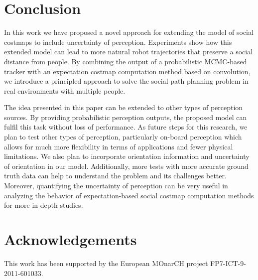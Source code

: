 \section{Conclusion}
\label{sec:conclusion}

In this work we have proposed a novel approach for extending the model of social costmaps to include uncertainty of perception. Experiments show how this extended model can lead to more natural robot trajectories that preserve a social distance from people. By combining the output of a probabilistic MCMC-based tracker with an expectation costmap computation method based on convolution, we introduce a principled approach to solve the social path planning problem in real environments with multiple people. 

The idea presented in this paper can be extended to other types of perception sources. By providing probabilistic perception outputs, the proposed model can fulfil this task without loss of performance. As future steps for this research, we plan to test other types of perception, particularly on-board perception which allows for much more flexibility in terms of applications and fewer physical limitations. We also plan to incorporate orientation information and uncertainty of orientation in our model. Additionally, more tests with more accurate ground truth data can help to understand the problem and its challenges better. Moreover, quantifying the uncertainty of perception can be very useful in analyzing the behavior of expectation-based social costmap computation methods for more in-depth studies.  


\section*{Acknowledgements}

This work has been supported by the European MOnarCH project FP7-ICT-9-2011-601033. 